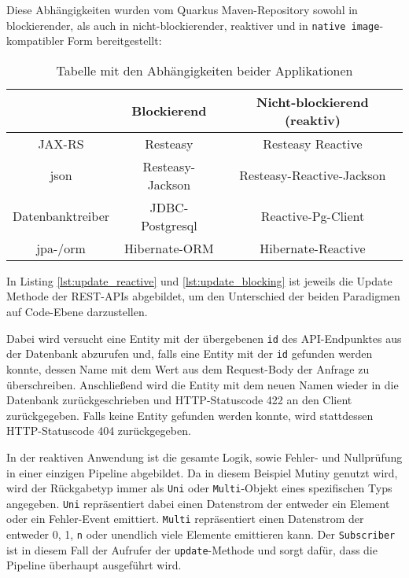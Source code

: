 Diese Abhängigkeiten wurden vom Quarkus Maven-Repository sowohl in blockierender,
als auch in nicht-blockierender, reaktiver und in \verb|native image|-kompatibler Form bereitgestellt: \parencite{MavenQuarkusIO}
\setlength{\tabcolsep}{18pt}
\renewcommand{\arraystretch}{1.5}
\begin{table}[ht!]
    \centering
    \begin{tabular}{| c | c | c |}
        \hline
                                       & Blockierend      & Nicht-blockierend (reaktiv) \\
        \hline
        JAX-RS                         & Resteasy         & Resteasy Reactive           \\
        \hline
        \acrshort{json}                & Resteasy-Jackson & Resteasy-Reactive-Jackson   \\
        \hline
        Datenbanktreiber               & JDBC-Postgresql  & Reactive-Pg-Client          \\
        \hline
        \acrshort{jpa}-/\acrshort{orm} & Hibernate-ORM    & Hibernate-Reactive          \\
        \hline
    \end{tabular}
    \caption{Tabelle mit den Abhängigkeiten beider Applikationen}
    \label{table:dependencies}
\end{table}

In Listing \ref{lst:update_reactive} und \ref{lst:update_blocking} ist jeweils die Update Methode der REST-APIs abgebildet, um den
Unterschied der beiden Paradigmen auf Code-Ebene darzustellen.

Dabei wird versucht eine Entity mit der übergebenen \verb|id| des API-Endpunktes
aus der Datenbank abzurufen und, falls eine Entity mit der \verb|id| gefunden werden konnte, dessen Name mit dem Wert
aus dem Request-Body der Anfrage zu überschreiben. Anschließend wird die Entity mit dem neuen Namen wieder in die Datenbank zurückgeschrieben
und HTTP-Statuscode 422 an den Client zurückgegeben. Falls keine Entity gefunden werden konnte, wird stattdessen
HTTP-Statuscode 404 zurückgegeben.

In der reaktiven Anwendung ist die gesamte Logik, sowie Fehler- und Nullprüfung in einer einzigen Pipeline abgebildet.
Da in diesem Beispiel Mutiny genutzt wird, wird der Rückgabetyp immer als \verb|Uni| oder \verb|Multi|-Objekt eines spezifischen Typs
angegeben. \verb|Uni| repräsentiert dabei einen Datenstrom der entweder ein Element oder ein Fehler-Event emittiert.
\verb|Multi| repräsentiert einen Datenstrom der entweder 0, 1, \verb|n| oder unendlich viele Elemente emittieren kann.
Der \verb|Subscriber| ist in diesem Fall der Aufrufer der \verb|update|-Methode und sorgt dafür, dass die Pipeline überhaupt ausgeführt wird.

